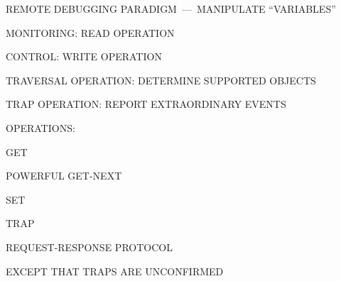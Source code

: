 \begin{bwslide}

\begin{nrtc}
\item	REMOTE DEBUGGING PARADIGM~---~MANIPULATE ``VARIABLES''
    \begin{nrtc}
    \item	MONITORING: READ OPERATION

    \item	CONTROL: WRITE OPERATION
    \end{nrtc}

\item	TRAVERSAL OPERATION: DETERMINE SUPPORTED OBJECTS

\item	TRAP OPERATION: REPORT EXTRAORDINARY EVENTS
\end{nrtc}
\end{bwslide}


\begin{bwslide}

\begin{nrtc}
\item	OPERATIONS:
    \begin{nrtc}
    \item	GET

    \item	POWERFUL GET-NEXT

    \item	SET

    \item	TRAP
    \end{nrtc}

\item	REQUEST-RESPONSE PROTOCOL
    \begin{nrtc}
    \item	EXCEPT THAT TRAPS ARE UNCONFIRMED
    \end{nrtc}
\end{nrtc}
\end{bwslide}


